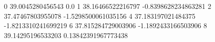 0 39.0045280456543 0.0
1 38.16466522216797 -0.8398628234863281
2 37.47467803955078 -1.5298500061035156
4 37.183197021484375 -1.8213310241699219
6 37.815284729003906 -1.1892433166503906
8 39.14295196533203 0.13842391967773438
